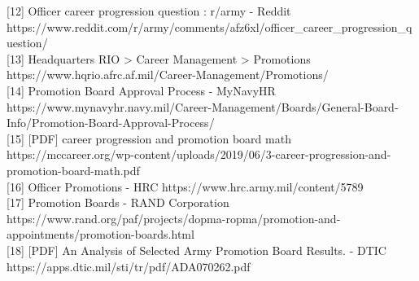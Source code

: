 \documentclass[./main.tex]{subfiles}
\begin{document}
{[}12{]} Officer career progression question : r/army - Reddit
https://www.reddit.com/r/army/comments/afz6xl/officer\_career\_progression\_question/\\
{[}13{]} Headquarters RIO \textgreater{} Career Management
\textgreater{} Promotions
https://www.hqrio.afrc.af.mil/Career-Management/Promotions/\\
{[}14{]} Promotion Board Approval Process - MyNavyHR
https://www.mynavyhr.navy.mil/Career-Management/Boards/General-Board-Info/Promotion-Board-Approval-Process/\\
{[}15{]} {[}PDF{]} career progression and promotion board math
https://mccareer.org/wp-content/uploads/2019/06/3-career-progression-and-promotion-board-math.pdf\\
{[}16{]} Officer Promotions - HRC
https://www.hrc.army.mil/content/5789\\
{[}17{]} Promotion Boards - RAND Corporation
https://www.rand.org/paf/projects/dopma-ropma/promotion-and-appointments/promotion-boards.html\\
{[}18{]} {[}PDF{]} An Analysis of Selected Army Promotion Board Results.
- DTIC https://apps.dtic.mil/sti/tr/pdf/ADA070262.pdf\\
\end{document}
